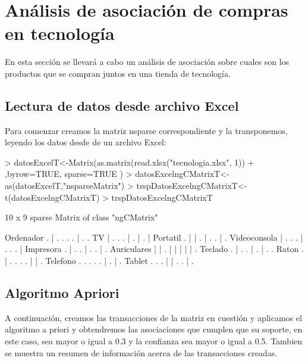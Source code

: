 \documentclass [a4paper] {article}
\begin{document}
\section{Análisis de asociación de compras en tecnología}
En esta sección se llevará a cabo un análisis de asociación sobre cuales son los productos que se compran juntos en una tienda de tecnología.

\subsection{Lectura de datos desde archivo Excel}
Para comenzar creamos la matriz nsparse correspondiente y la transponemos, leyendo los datos desde de un archivo Excel:

\begin{Schunk}
\begin{Sinput}
> datosExcelT<-Matrix(as.matrix(read.xlsx("tecnologia.xlsx", 1))
+ ,byrow=TRUE, sparse=TRUE )
> datosExcelngCMatrixT<-as(datosExcelT,"nsparseMatrix")
> trspDatosExcelngCMatrixT<-t(datosExcelngCMatrixT)
> trspDatosExcelngCMatrixT
\end{Sinput}
\begin{Soutput}
10 x 9 sparse Matrix of class "ngCMatrix"
                              
Ordenador    . | . . . . | . .
TV           | . . . | . | . |
Portatil     . | | . | . . | .
Videoconsola | . . . | . . . |
Impresora    . | . . | . . | .
Auriculares  | | . | | | | | .
Teclado      . | . . | . | . .
Raton        . | . . . . | | .
Telefono     . . . . . | . | .
Tablet       . . . | | . . | .
\end{Soutput}
\end{Schunk}

\subsection{Algoritmo Apriori}
A continuación, creamos las transacciones de la matriz en cuestión y aplicamos el algoritmo a priori y obtendremos las asociaciones que cumplen que su soporte, en este caso, sea mayor o igual a 0.3 y la confianza sea mayor o igual a 0.5.  Tambien se muestra un resumen de información acerca de las transacciones creadas.
\end{document}
